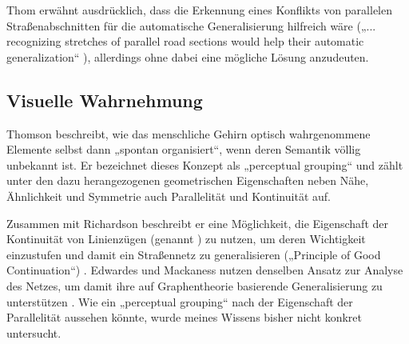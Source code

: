 \documentclass[../main/thesis.tex]{subfiles}
\begin{document}

Thom erwähnt ausdrücklich, dass die Erkennung eines Konflikts von parallelen Straßenabschnitten für die automatische Generalisierung hilfreich wäre („... recognizing stretches of parallel road sections would help their automatic generalization“ ), allerdings ohne dabei eine mögliche Lösung anzudeuten.


\subsection{Visuelle Wahrnehmung}


Thomson beschreibt, wie das menschliche Gehirn optisch wahrgenommene Elemente selbst dann „spontan organisiert“, wenn deren Semantik völlig unbekannt ist. Er bezeichnet dieses Konzept als „perceptual grouping“ und zählt unter den dazu herangezogenen geometrischen Eigenschaften neben Nähe, Ähnlichkeit und Symmetrie auch Parallelität und Kontinuität auf. 


Zusammen mit Richardson beschreibt er eine Möglichkeit, die Eigenschaft der Kontinuität von Linienzügen (genannt ) zu nutzen, um deren Wichtigkeit einzustufen und damit ein Straßennetz zu generalisieren („Principle of Good Continuation“) . Edwardes und Mackaness nutzen denselben Ansatz zur Analyse des Netzes, um damit ihre auf Graphentheorie basierende Generalisierung zu unterstützen .
Wie ein „perceptual grouping“ nach der Eigenschaft der Parallelität aussehen könnte, wurde meines Wissens bisher nicht konkret untersucht.
\end{document}
